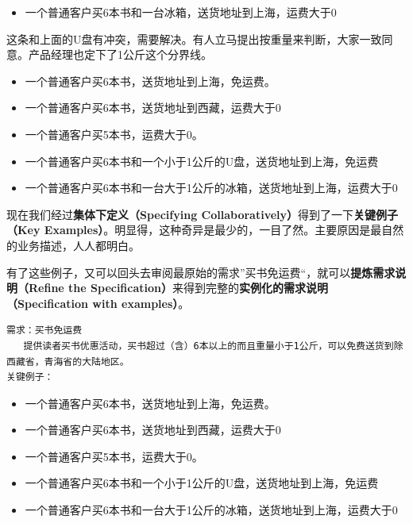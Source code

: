 \begin{itemize}
\item 一个普通客户买6本书和一台冰箱，送货地址到上海，运费大于0

\end{itemize}

这条和上面的U盘有冲突，需要解决。有人立马提出按重量来判断，大家一致同意。产品经理也定下了1公斤这个分界线。

\begin{itemize}
\item 一个普通客户买6本书，送货地址到上海，免运费。

\item 一个普通客户买6本书，送货地址到西藏，运费大于0

\item 一个普通客户买5本书，运费大于0。

\item 一个普通客户买6本书和一个小于1公斤的U盘，送货地址到上海，免运费

\item 一个普通客户买6本书和一台大于1公斤的冰箱，送货地址到上海，运费大于0

\end{itemize}

现在我们经过\textbf{集体下定义（Specifying Collaboratively）}得到了一下\textbf{关键例子（Key Examples）}。明显得，这种奇异是最少的，一目了然。主要原因是最自然的业务描述，人人都明白。

有了这些例子，又可以回头去审阅最原始的需求”买书免运费“，就可以\textbf{提炼需求说明（Refine the Specification）}来得到完整的\textbf{实例化的需求说明（Specification with examples）}。

\begin{verbatim}
需求：买书免运费
   提供读者买书优惠活动，买书超过（含）6本以上的而且重量小于1公斤，可以免费送货到除西藏省，青海省的大陆地区。
关键例子：
\end{verbatim}

\begin{itemize}
\item 一个普通客户买6本书，送货地址到上海，免运费。

\item 一个普通客户买6本书，送货地址到西藏，运费大于0

\item 一个普通客户买5本书，运费大于0。

\item 一个普通客户买6本书和一个小于1公斤的U盘，送货地址到上海，免运费

\item 一个普通客户买6本书和一台大于1公斤的冰箱，送货地址到上海，运费大于0

\end{itemize}

